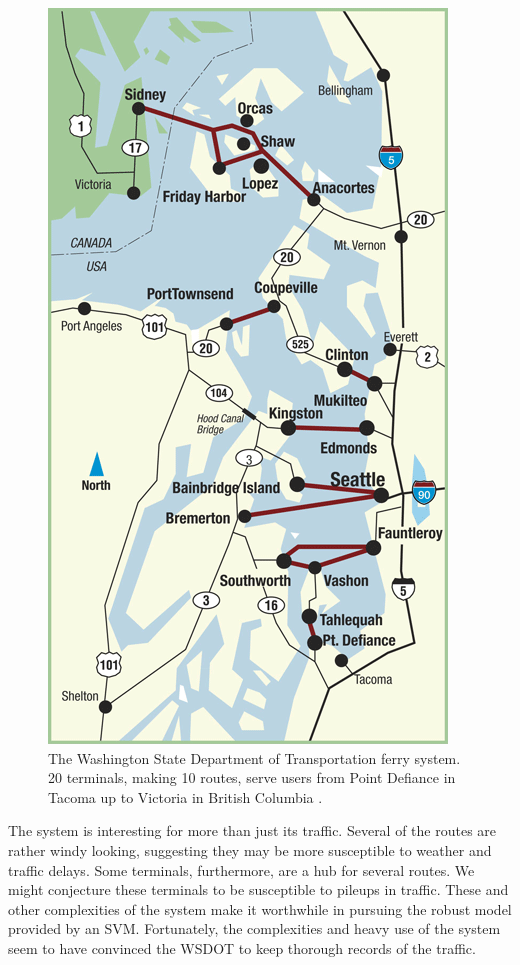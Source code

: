 \documentclass[11pt]{article} %
\begin{document}
\begin{figure}
  \centering
  \includegraphics[scale=.4]{images/route-map-overview.png}
  \caption{The Washington State Department of Transportation ferry system. 20
  terminals, making 10 routes, serve users from Point Defiance in Tacoma up to
  Victoria in British Columbia \cite{wsdotVesselWatch}.}
  \label{fig:ferry_system}
\end{figure}

The system is interesting for more than just its traffic. Several of the routes
are rather windy looking, suggesting they may be more susceptible to weather and
traffic delays. Some terminals, furthermore, are a hub for several routes. We
might conjecture these terminals to be susceptible to pileups in traffic. These 
and other complexities of the system make it worthwhile in pursuing the robust 
model provided by an SVM. Fortunately, the complexities and heavy use of the
system seem to have convinced the WSDOT to keep thorough records of the traffic.
\end{document}

